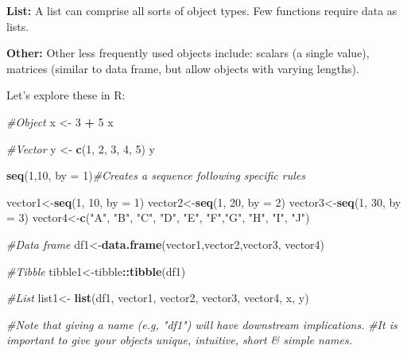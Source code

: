 \documentclass[]{article}
\newenvironment{Shaded}{\begin{snugshade}}{\end{snugshade}}
\newcommand{\CommentTok}[1]{\textcolor[rgb]{0.56,0.35,0.01}{\textit{#1}}}
\newcommand{\DataTypeTok}[1]{\textcolor[rgb]{0.13,0.29,0.53}{#1}}
\newcommand{\DecValTok}[1]{\textcolor[rgb]{0.00,0.00,0.81}{#1}}
\newcommand{\KeywordTok}[1]{\textcolor[rgb]{0.13,0.29,0.53}{\textbf{#1}}}
\newcommand{\NormalTok}[1]{#1}
\newcommand{\OperatorTok}[1]{\textcolor[rgb]{0.81,0.36,0.00}{\textbf{#1}}}
\newcommand{\StringTok}[1]{\textcolor[rgb]{0.31,0.60,0.02}{#1}}
\begin{document}
\textbf{List:} A list can comprise all sorts of object types. Few
functions require data as lists.

\textbf{Other:} Other less frequently used objects include: scalars (a
single value), matrices (similar to data frame, but allow objects with
varying lengths).

Let's explore these in R:

\begin{Shaded}
\begin{Highlighting}[]
\CommentTok{#Object}
\NormalTok{x <-}\StringTok{ }\DecValTok{3} \OperatorTok{+}\StringTok{ }\DecValTok{5}
\NormalTok{x}

\CommentTok{#Vector}
\NormalTok{y <-}\StringTok{ }\KeywordTok{c}\NormalTok{(}\DecValTok{1}\NormalTok{, }\DecValTok{2}\NormalTok{, }\DecValTok{3}\NormalTok{, }\DecValTok{4}\NormalTok{, }\DecValTok{5}\NormalTok{) }
\NormalTok{y}

\KeywordTok{seq}\NormalTok{(}\DecValTok{1}\NormalTok{,}\DecValTok{10}\NormalTok{, }\DataTypeTok{by =} \DecValTok{1}\NormalTok{)}\CommentTok{#Creates a sequence following specific rules }

\NormalTok{vector1<-}\KeywordTok{seq}\NormalTok{(}\DecValTok{1}\NormalTok{, }\DecValTok{10}\NormalTok{,  }\DataTypeTok{by =} \DecValTok{1}\NormalTok{)}
\NormalTok{vector2<-}\KeywordTok{seq}\NormalTok{(}\DecValTok{1}\NormalTok{, }\DecValTok{20}\NormalTok{, }\DataTypeTok{by =} \DecValTok{2}\NormalTok{)}
\NormalTok{vector3<-}\KeywordTok{seq}\NormalTok{(}\DecValTok{1}\NormalTok{, }\DecValTok{30}\NormalTok{,  }\DataTypeTok{by =} \DecValTok{3}\NormalTok{)}
\NormalTok{vector4<-}\KeywordTok{c}\NormalTok{(}\StringTok{"A"}\NormalTok{, }\StringTok{"B"}\NormalTok{, }\StringTok{"C"}\NormalTok{, }\StringTok{"D"}\NormalTok{, }\StringTok{"E"}\NormalTok{, }\StringTok{"F"}\NormalTok{,}\StringTok{"G"}\NormalTok{, }\StringTok{"H"}\NormalTok{, }\StringTok{"I"}\NormalTok{, }\StringTok{"J"}\NormalTok{)}

\CommentTok{#Data frame}
\NormalTok{df1<-}\KeywordTok{data.frame}\NormalTok{(vector1,vector2,vector3, vector4)}

\CommentTok{#Tibble}
\NormalTok{tibble1<-tibble}\OperatorTok{::}\KeywordTok{tibble}\NormalTok{(df1)}

\CommentTok{#List}
\NormalTok{list1<-}\StringTok{ }\KeywordTok{list}\NormalTok{(df1, vector1, vector2, vector3, vector4, x, y) }

\CommentTok{#Note that giving a name (e.g, "df1") will have downstream implications.}
\CommentTok{#It is important to give your objects unique, intuitive, short & simple names.}
\end{Highlighting}
\end{Shaded}
\end{document}
